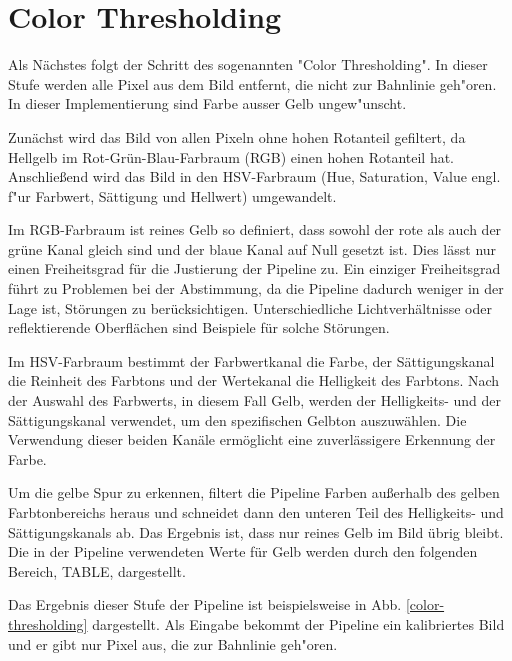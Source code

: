 \documentclass[arbeit=studie,oneside,BCOR=12mm]{ArbeitRST}
\begin{document}
\section{\glqq Color Thresholding\grqq}

Als Nächstes folgt der Schritt des sogenannten "Color Thresholding". In dieser
Stufe werden alle Pixel aus dem Bild entfernt, die nicht zur Bahnlinie geh"oren.
In dieser Implementierung sind Farbe ausser Gelb ungew"unscht.

Zunächst wird das Bild von allen Pixeln ohne hohen Rotanteil gefiltert, da
Hellgelb im Rot-Grün-Blau-Farbraum (RGB) einen hohen Rotanteil hat.
Anschließend wird das Bild in den HSV-Farbraum (Hue, Saturation, Value engl. f"ur Farbwert, Sättigung und
Hellwert) umgewandelt. 

Im RGB-Farbraum ist reines Gelb so definiert, dass sowohl der rote als auch der
grüne Kanal gleich sind und der blaue Kanal auf Null gesetzt ist. Dies lässt
nur einen Freiheitsgrad für die Justierung der Pipeline zu.  Ein einziger
Freiheitsgrad führt zu Problemen bei der Abstimmung, da die Pipeline dadurch
weniger in der Lage ist, Störungen zu berücksichtigen. Unterschiedliche
Lichtverhältnisse oder reflektierende Oberflächen sind Beispiele für solche
Störungen.

Im HSV-Farbraum bestimmt der Farbwertkanal die Farbe, der Sättigungskanal die
Reinheit des Farbtons und der Wertekanal die Helligkeit des Farbtons. \cite{hsv}
Nach der Auswahl des Farbwerts, in diesem Fall Gelb, werden der Helligkeits-
und der Sättigungskanal verwendet, um den spezifischen Gelbton auszuwählen. Die
Verwendung dieser beiden Kanäle ermöglicht eine zuverlässigere Erkennung der
Farbe.

Um die gelbe Spur zu erkennen, filtert die Pipeline Farben außerhalb des gelben
Farbtonbereichs heraus und schneidet dann den unteren Teil des Helligkeits- und
Sättigungskanals ab. Das Ergebnis ist, dass nur reines Gelb im Bild übrig
bleibt. Die in der Pipeline verwendeten Werte für Gelb werden durch den
folgenden Bereich, TABLE, dargestellt.

Das Ergebnis dieser Stufe der Pipeline ist beispielsweise in Abb. \ref{color-thresholding}
dargestellt. Als Eingabe bekommt der Pipeline ein kalibriertes Bild und er gibt nur Pixel aus, die 
zur Bahnlinie geh"oren. \\
\end{document}
